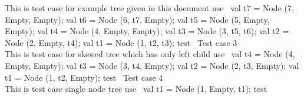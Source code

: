 \documentclass[10pt,a4paper]{article}%
\begin{document}
This is test case for example tree given in this document
\nwenddocs{}\endmoddef\nwstartdeflinemarkup\nwenddeflinemarkup
\LA{}use~{\nwtagstyle{}}\RA{}
val t7 = Node (7, Empty, Empty);
val t6 = Node (6, t7, Empty);
val t5 = Node (5, Empty, Empty);
val t4 = Node (4, Empty, Empty);
val t3 = Node (3, t5, t6);
val t2 = Node (2, Empty, t4);
val t1 = Node (1, t2, t3);
\LA{}test~{\nwtagstyle{}}\RA{}
\nwendcode{}\nwdocspar
Test case 3\\
This is test case for skewed tree which has only left child
\nwenddocs{}\endmoddef\nwstartdeflinemarkup\nwenddeflinemarkup
\LA{}use~{\nwtagstyle{}}\RA{}
val t4 = Node (4, Empty, Empty);
val t3 = Node (3, t4, Empty);
val t2 = Node (2, t3, Empty);
val t1 = Node (1, t2, Empty);
\LA{}test~{\nwtagstyle{}}\RA{}
\nwendcode{}\nwdocspar
Test case 4\\
This is test case single node tree
\nwenddocs{}\endmoddef\nwstartdeflinemarkup\nwenddeflinemarkup
\LA{}use~{\nwtagstyle{}}\RA{}
val t1 = Node (1, Empty, t1);
\LA{}test~{\nwtagstyle{}}\RA{}
\nwendcode{}
\end{document}
